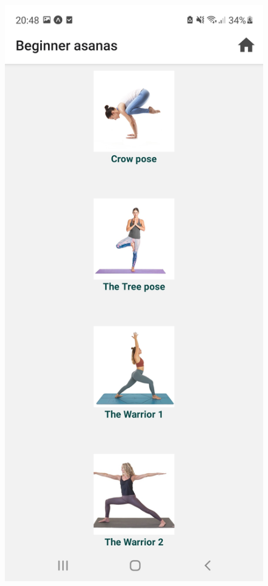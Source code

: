 \documentclass[a4paper, 12pt]{book}
\begin{document}
\begin{figure}[!htbp]
\begin{minipage}[b]{0.32\textwidth}
  \end{minipage}
  \begin{minipage}[b]{0.32\textwidth}
    \includegraphics[width=\textwidth]{beginnerasanas.jpg}\centering

\end{minipage}
\end{figure}
\end{document}
